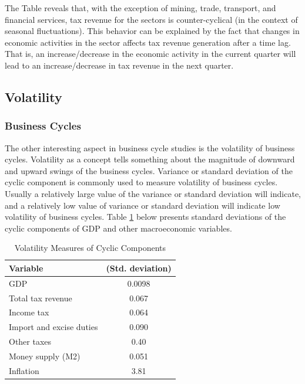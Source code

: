 \documentclass[12pt,a4paper,final]{article}
\begin{document}
The Table reveals that, with the exception of mining, trade, transport, and financial services, tax revenue for the sectors is counter-cyclical (in the context of seasonal fluctuations).  This behavior can be explained by the fact that changes in economic activities in the sector affects tax revenue generation after a time lag. That is, an increase/decrease in the economic activity in the current quarter will lead to an increase/decrease in tax revenue in the next quarter.

\subsection{Volatility}

\subsubsection{Business Cycles}

The other interesting aspect in business cycle studies is the volatility of business cycles. Volatility as a concept tells something about the magnitude of downward and upward swings of the business cycles. Variance or standard deviation of the cyclic component is commonly used to measure volatility of business cycles. Usually a relatively large value of the variance or standard deviation will indicate, and a relatively low value of variance or standard deviation will indicate low volatility of business cycles. Table \ref{tab4} below presents standard deviations of the cyclic components of GDP and other macroeconomic variables.

\begin{table}[h]
\centering
\begin{small} 
\caption{Volatility Measures of Cyclic Components} 
\label{tab4}
\begin{tabular}{l c}
\toprule
\multicolumn{1}{l}{\textbf{Variable}} & \textbf{(Std. deviation)}\\ 
 \midrule
GDP & 0.0098\\ 
Total tax revenue & 0.067 \\
Income tax & 0.064 \\
Import and excise duties & 0.090\\
Other taxes  & 0.40\\
Money supply (M2) & 0.051 \\
Inflation & 3.81\\
\bottomrule
\end{tabular}
\end{small}
\end{table}
\end{document}
